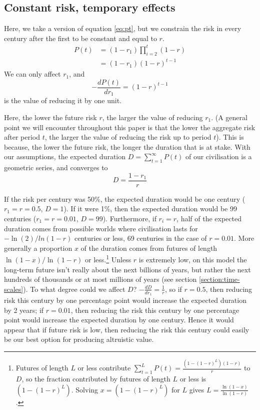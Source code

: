 \documentclass[british]{article}
\begin{document}
\subsection{Constant risk, temporary effects}\label{cr-te}


Here, we take a version of equation \ref{eq:pt}, but we constrain the risk in every century after the first to be constant and equal to $r$.
\begin{align*}
P(t) &= (1-r_1) \prod_{i=2}^{t}(1-r) \\
&= (1-r_1)(1-r)^{t-1}
\end{align*}
We can only affect $r_1$, and \[-\frac{dP(t)}{dr_1} = (1-r) ^{t-1}\] is the value of reducing it by one unit.

Here, the lower the future risk \(r\), the larger the value of reducing
\(r_1\). (A general point we will encounter throughout this paper is that the lower the aggregate risk after period $t$, the larger the value of reducing the risk up to period $t$). This is because, the lower the future risk, the longer the duration that is at stake. With our assumptions, the expected duration $D=\sum_{t=1}^\infty P(t)$ of our civilisation is a geometric series, and converges to $$D=\frac{1-r_1}{r}$$

If the risk per century was 50\%, the expected duration would be one century ($r_1=r=0.5$, $D=1$). If it were 1\%, then the expected duration would be 99 centuries ($r_1=r=0.01$, $D=99$). Furthermore, if $r_i=r$, half of the expected duration comes from possible worlds where civilisation lasts for $-\ln(2)/ln(1-r)$ centuries or less, 69 centuries in the case of $r=0.01$. More generally a proportion $x$ of the duration comes from futures of length $\ln(1-x)/\ln(1-r)$ or less.\footnote{Futures of length $L$ or less contribute $\sum_{t=1}^L P(t)=\frac{(1-(1-r)^L)(1-r)}{r}$ to $D$, so the fraction contributed by futures of length $L$ or less is $(1-(1-r)^L)$. Solving $x=(1-(1-r)^L)$ for $L$ gives $L=\frac{\ln(1-x)}{\ln(1-r)}$.} Unless $r$ is extremely low, on this model the long-term future isn't really about the next billions of years, but rather the next hundreds of thousands or at most millions of years (see section \ref{section:time-scales}). To what degree could we affect $D$? $-\frac{dD}{dr_1}=\frac{1}{r}$, so if $r=0.5$, then reducing risk this century by one percentage point would increase the expected duration by 2 years; if $r=0.01$, then reducing the risk this century by one percentage point would increase the expected duration by one century. Hence it would appear that if future risk is low, then reducing the risk this century could easily be our best option for producing altruistic value.
\end{document}
